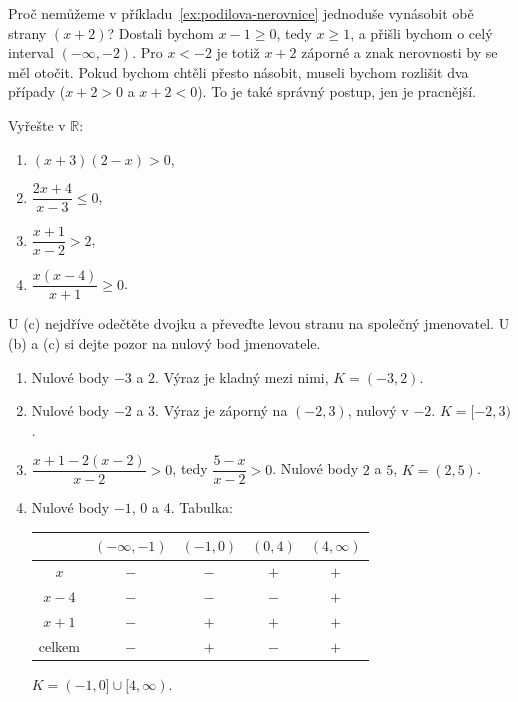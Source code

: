 \begin{note}
  Proč nemůžeme v příkladu~\ref{ex:podilova-nerovnice} jednoduše vynásobit obě strany $(x + 2)$? Dostali bychom $x - 1\geq 0$, tedy $x\geq 1$, a přišli bychom o celý interval $(-\infty, -2)$. Pro $x < -2$ je totiž $x + 2$ záporné a znak nerovnosti by se měl otočit. Pokud bychom chtěli přesto násobit, museli bychom rozlišit dva případy ($x + 2 > 0$ a $x + 2 < 0$). To je také správný postup, jen je pracnější.
\end{note}

\begin{problem}
  Vyřešte v $\mathbb{R}$:
  \begin{enumerate}[label=(\alph*)]
    \item $(x + 3)(2 - x) > 0$,
    \item $\dfrac{2x + 4}{x - 3}\leq 0$,
    \item $\dfrac{x + 1}{x - 2} > 2$,
    \item $\dfrac{x(x - 4)}{x + 1}\geq 0$.
  \end{enumerate}
\end{problem}

\begin{hint}
  U (c) nejdříve odečtěte dvojku a převeďte levou stranu na společný jmenovatel. U (b) a (c) si dejte pozor na nulový bod jmenovatele.
\end{hint}

\begin{solution}
  \begin{enumerate}[label=(\alph*)]
    \item Nulové body $-3$ a $2$. Výraz je kladný mezi nimi, $K = (-3, 2)$.
    \item Nulové body $-2$ a $3$. Výraz je záporný na $(-2, 3)$, nulový v $-2$. $K = [-2, 3)$.
    \item $\dfrac{x + 1 - 2(x - 2)}{x - 2} > 0$, tedy $\dfrac{5 - x}{x - 2} > 0$. Nulové body $2$ a $5$, $K = (2, 5)$.
    \item Nulové body $-1$, $0$ a $4$. Tabulka:
    \begin{center}
      \renewcommand{\arraystretch}{1.3}
      \begin{tabular}{|c|c|c|c|c|}
        \hline
         & $(-\infty, -1)$ & $(-1, 0)$ & $(0, 4)$ & $(4, \infty)$ \\
        \hline
        $x$ & $-$ & $-$ & $+$ & $+$ \\
        $x - 4$ & $-$ & $-$ & $-$ & $+$ \\
        $x + 1$ & $-$ & $+$ & $+$ & $+$ \\
        \hline
        celkem & $-$ & $+$ & $-$ & $+$ \\
        \hline
      \end{tabular}
    \end{center}
    $K = (-1, 0]\cup[4, \infty)$.
  \end{enumerate}
\end{solution}

